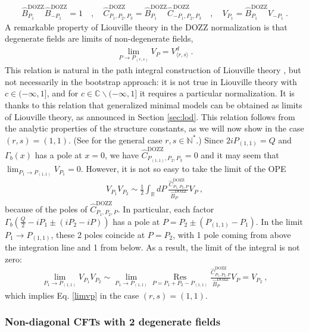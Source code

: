 \documentclass[12pt, a4paper]{article}
\begin{document}
\begin{align}
 \hat B^\text{DOZZ}_{P_1}\hat B^\text{DOZZ}_{-P_1}=1 \quad , \quad  \hat C^\text{DOZZ}_{P_1,P_2,P_3} = \hat B^\text{DOZZ}_{P_1}\hat C^\text{DOZZ}_{-P_1,P_2,P_3} \quad , \quad V_{P_1} = \hat B^\text{DOZZ}_{P_1} V_{-P_1}\ . 
\end{align}
A remarkable property of Liouville theory in the DOZZ normalization is that degenerate fields are limits of non-degenerate fields,
\begin{align}
 \lim_{P\to P_{(r,s)}} V_P = V^d_{\langle r,s\rangle} \ .
 \label{limvp}
\end{align}
This relation is natural in the path integral construction of Liouville theory \cite{zz95}, but not necessarily in the bootstrap approach: it is not true in Liouville theory with $c\in (-\infty, 1]$, and for $c\in\mathbb{C}\backslash (-\infty,1]$ it requires a particular normalization. It is thanks to this relation that generalized minimal models can be obtained as limits of Liouville theory, as announced in Section \ref{sec:lod}. This relation follows from the analytic properties of the structure constants, as we will now show in the case $(r,s)=(1,1)$. (See \cite[Section 3.1.5]{rib14} for the general case $r,s\in\mathbb{N}^*$.) Since $2iP_{(1,1)}=Q$ and $\Gamma_b(x)$ has a pole at $x=0$, we have $\hat C^\text{DOZZ}_{P_{(1,1)},P_2,P_3} = 0$ and it may seem that $\lim_{P_1\to P_{(1,1)}} V_{P_1} = 0$. However, it is not so easy to take the limit of the OPE 
\begin{align}
V_{P_1}V_{P_2} \sim \frac12 \int_{\mathbb{R}}dP\ \frac{\hat C^\text{DOZZ}_{P_1,P_2,P}}{\hat B^\text{DOZZ}_{P}}V_P\ , 
\end{align}
because of the poles of $\hat C^\text{DOZZ}_{P_1,P_2,P}$. In particular, each factor $\Gamma_b(\frac{Q}{2}-iP_1\pm (iP_2-iP))$ has a pole at $P= P_2\pm (P_{(1,1)}-P_1)$. In the limit $P_1\to P_{(1,1)}$, these 2 poles coincide at $P=P_2$, with 1 pole coming from above the integration line and 1 from below. As a result, the limit of the integral is not zero: 
\begin{align}
 \lim_{P_1\to P_{(1,1)}}V_{P_1}V_{P_2} \sim \lim_{P_1\to P_{(1,1)}}  \underset{P=P_1+P_2-P_{(1,1)}}{\operatorname{Res}}\frac{\hat C^\text{DOZZ}_{P_1,P_2,P}}{\hat B^\text{DOZZ}_{P}}V_P=V_{P_2}\ ,
\end{align}
which implies Eq. \eqref{limvp} in the case $(r,s)=(1,1)$. 

\subsubsection{Non-diagonal CFTs with 2 degenerate fields}
\end{document}
